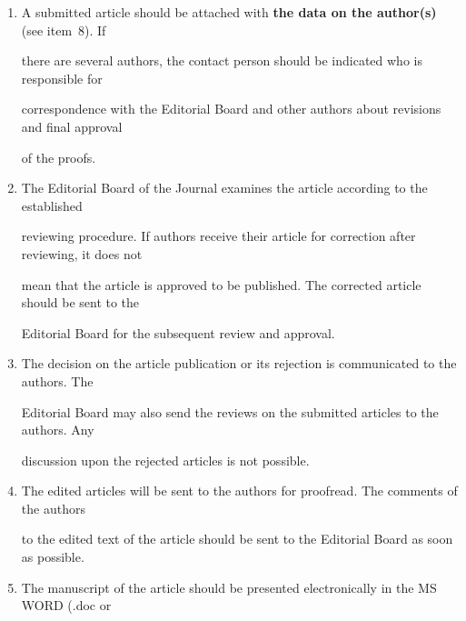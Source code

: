 {{\begin{enumerate}[1.]
the submitted article has no classified data prohibited for publication. \\[-13.5pt]


\item


A submitted article should be attached with \textbf{the data on the author(s)} (see item~8). If


there are several authors, the contact person should be indicated who is responsible for


correspondence with the Editorial Board and other authors about revisions and final approval


of the proofs.\\[-13.5pt]





\item The Editorial Board of the Journal examines the article according to the established


reviewing procedure. If authors receive their article for correction after reviewing, it does not


mean that the article is approved to be published. The corrected article should be sent to the


Editorial Board for the subsequent review and approval.\\[-13.5pt]





\item The decision on the article publication or its rejection is communicated to the authors. The


Editorial Board may also send the reviews on the submitted articles to the authors. Any


discussion upon the rejected articles is not possible.\\[-13.5pt]





\item The edited articles will be sent to the authors for proofread. The comments of the authors


to the edited text of the article should be sent to the Editorial Board as soon as possible.\\[-13.5pt]





\item The manuscript of the article should be presented electronically in the MS WORD (.doc or



\end{enumerate}}}
